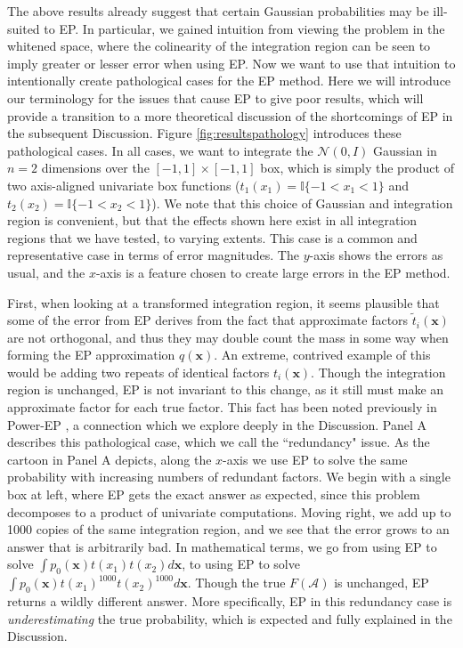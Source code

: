 \documentclass[twoside,11pt]{article}
\newcommand{\II}{\mathbb{I}}
\def\x{{\mathbf x}}
\def\regionA{\mathcal{A}}
\begin{document}
The above results already suggest that certain Gaussian probabilities may be ill-suited to EP.   In particular, we gained intuition from viewing the problem in the whitened space, where the colinearity of the integration region can be seen to imply greater or lesser error when using EP.  Now we want to use that intuition to intentionally create pathological cases for the EP method.  Here we will introduce our terminology for the issues that cause EP to give poor results, which will provide a transition to a more theoretical discussion of the shortcomings of EP in the subsequent Discussion.  Figure \ref{fig:resultspathology} introduces these pathological cases.  In all cases, we want to integrate the $\mathcal{N}(0,I)$ Gaussian in $n=2$ dimensions over the $[-1,1] \times [-1,1]$ box, which is simply the product of two axis-aligned univariate box functions ($t_1(x_1)= \II\{-1 < x_1 < 1\}$ and $t_2(x_2)= \II\{-1 < x_2 < 1\}$).  We note that this choice of Gaussian and integration region is convenient, but that the effects shown here exist in all integration regions that we have tested, to varying extents.  This case is a common and representative case in terms of error magnitudes.  The $y$-axis shows the errors as usual, and the $x$-axis is a feature chosen to create large errors in the EP method.  

First, when looking at a transformed integration region, it seems plausible that some of the error from EP derives from the fact that approximate factors $\tilde{t}_i(\x)$ are not orthogonal, and thus they may double count the mass in some way when forming the EP approximation $q(\x)$.   An extreme, contrived example of this would be adding two repeats of identical factors $t_i(\x)$.  Though the integration region is unchanged, EP is not invariant to this change, as it still must make an approximate factor for each true factor.  This fact has been noted previously in Power-EP \cite[]{PowerEP}, a connection which we explore deeply in the Discussion.   Panel A describes this pathological case, which we call the ``redundancy" issue.   As the cartoon in Panel A depicts, along the $x$-axis we use EP to solve the same probability with increasing numbers of redundant factors.  We begin with a single box at left, where EP gets the exact answer as expected, since this problem decomposes to a product of univariate computations.  Moving right, we add up to 1000 copies of the same integration region, and we see that the error grows to an answer that is arbitrarily bad.  In mathematical terms, we go from using EP to solve $\int p_0(\x) t(x_1)t(x_2) d\x$, to using EP to solve $\int p_0(\x) t(x_1)^{1000}t(x_2)^{1000} d\x$.  Though the true $F(\regionA)$ is unchanged, EP returns a wildly different answer.    More specifically, EP in this redundancy case is \emph{underestimating} the true probability, which is expected and fully explained in the Discussion.  
\end{document}
